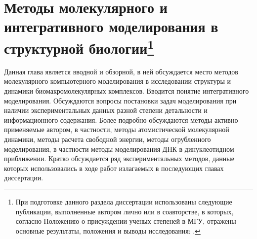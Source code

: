 \chapter[Методы молекулярного и интегративного моделирования в структурной биологии]{Методы молекулярного и интегративного моделирования в структурной биологии\footnote{При подготовке данного раздела диссертации использованы следующие публикации, выполненные автором лично или в соавторстве, в которых, согласно Положению о присуждении ученых степеней в МГУ, отражены основные результаты, положения и выводы исследования: \cite{hada_histone_2019,bass_effect_2019,armeev_linking_2019,shaytan_structural_2018,gorkovets_joint_2018,xiao_molecular_2017,shaytan_hydroxyl-radical_2017,gribkova_investigation_2017,el_kennani_ms_histonedb_2017,chertkov_dual_2017,armeev_modeling_2016,armeev_nucleosome_2016,biswas_genomic_2016,draizen_histonedb_2016,lyubitelev_structure_2016,shaitan_dynamics_2016,shaytan_coupling_2016,shaytan_trajectories_2016,valieva_large-scale_2016,armeev_conformational_2015,armeev_molecular_2015,frank_direct_2015,gaykalova_structural_2015,goncearenco_structural_2015,shaytan_nucleosome_2015,bozdaganyan_comparative_2014,chang_analysis_2014,kasimova_voltage-gated_2014,nishi_physicochemical_2014,sokolova_genome_2014,yolamanova_peptide_2013,shaitan_influence_2013,orekhov_calculation_2012,shaytan_self-assembling_2011,shaytan_self-organizing_2011,armeev_integrative_2020,kniazeva_analyzing_2020,armeev_analyzing_2019,gribkova_construction_2019,armeev_python_2019,gorkovets_mutual_2018,shaytan_microsecond_2017,shaytan_nucleosome_2016,shaytan_combined_2015,shaytan_polymorphism_2015,kasimova_investigation_2014,kasimova_molecular_2014,chang_pausing_2013,armeev_abstract_2019,bass_abstract_2019,greshnova_sinteticheskaya_2019,shaytan_water_2014,chang_structural_2013,armeev_modelirovanie_2013}.}} \label{chapt1_mod_methods}

Данная глава является вводной и обзорной, в ней обсуждается место методов молекулярного компьютерного моделирования в исследовании структуры и динамики биомакромолекулярных комплексов. Вводится понятие интегративного моделирования. Обсуждаются вопросы постановки задач моделирования при наличии экспериментальных данных разной степени детальности и информационного содержания. Более подробно обсуждаются методы активно применяемые автором, в частности, методы атомистической молекулярной динамики, методы расчета свободной энергии, методы огрубленного моделирования, в частности методы моделирования ДНК в динуклеотидном приближении. Кратко обсуждается ряд экспериментальных методов, данные которых использовались в ходе работ излагаемых в последующих главах диссертации.

